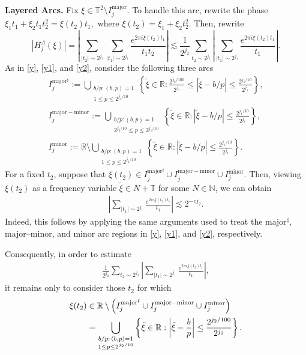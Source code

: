 \documentclass[11 pt,letterpaper]{amsart}
\theoremstyle{plain}
\theoremstyle{definition}
\theoremstyle{remark} \theoremstyle{exam} \theoremstyle{ob}
\numberwithin{equation}{section}
\begin{document}
\noindent\textbf{Layered Arcs.}
Fix $\xi\in
\mathbb{T}^2 \setminus I^{\mathrm{major}}_{j}.$ To handle this arc, rewrite the phase
$\xi_{1} t_1+\xi_{2} t_1t_2^2=\xi(t_2)t_1,$ where $\xi(t_2)=\xi_{1}+\xi_{2}t_2^2.$ Then, rewrite $$|H^{\Lambda}_{j}(\xi)|=\left|\sum_{|t_2|\sim 2^{j_2}}\sum_{|t_1|\sim 2^{j_1}}\frac{e^{2\pi i\xi(t_2)t_1}}{t_1t_2}\right|\lesssim \frac{1}{2^{j_2}}\sum_{t_2\sim 2^{j_2}}\left|\sum_{|t_1|\sim 2^{j_1}}\frac{e^{2\pi i\xi(t_2)t_1}}{t_1}\right|.$$ As in \eqref{y}, \eqref{y1}, and \eqref{y2}, consider the following three arcs \begin{align*}
I^{\mathrm{major^{\sharp}}}_{j}:= 	\bigcup_{\substack{b/p : (b,p)=1 \\ 1\le p \le 2^{j_2/10}}}
	\left\{
	\tilde{\xi} \in \mathbb{R} : \frac{2^{j_2/100}}{2^{j_1}}\le
	|\tilde{\xi} - b/p| \le \frac{2^{j_1/10}}{2^{j_1}}
	\right\},\\
I^{\mathrm{major-minor}}_{j}:=	\bigcup_{\substack{b/p : (b,p)=1 \\ 2^{j_2/10}\le p \le 2^{j_1/10}}}
	\left\{
	\tilde{\xi} \in \mathbb{R} :
	|\tilde{\xi} - b/p| \le \frac{2^{j_1/10}}{2^{j_1}}
	\right\},\\
 I^{\mathrm{minor}}_{j}:=	\mathbb{R}\setminus
	\bigcup_{\substack{b/p : (b,p)=1 \\ 1\le p \le 2^{j_1/10}}}
	\left\{
	\tilde{\xi} \in \mathbb{R} :
	|\tilde{\xi} - b/p| \le \frac{2^{j_1/10}}{2^{j_1}}
	\right\}.
\end{align*}  For a fixed  $t_2$, suppose that $\xi(t_2)\in I^{\mathrm{major^{\sharp}}}_{j}\cup I^{\mathrm{major-minor}}_{j}\cup   I^{\mathrm{minor}}_{j}.$ Then, viewing $\xi(t_2)$ as a frequency variable $\widetilde{\xi}\in N+\mathbb{T}$ for some $N\in\mathbb{N}$, 
we can obtain
\begin{align}\label{y77}
\left|
\sum_{|t_1|\sim 2^{j_1}}
\frac{e^{2\pi i \xi(t_2)t_1}}{t_1}
\right|
\lesssim 2^{-c j_2}.
\end{align}
Indeed, this follows by applying the same arguments used to treat the $\mathrm{major}^{\sharp}$, major--minor, and minor arc regions in \eqref{y}, \eqref{y1}, and \eqref{y2}, respectively.

Consequently, in order to estimate 
\begin{align*} \frac{1}{2^{j_2}} \sum_{t_2\sim 2^{j_2}} \left| \sum_{|t_1|\sim 2^{j_1}} \frac{e^{2\pi i \xi(t_2)t_1}}{t_1} \right|, 
\end{align*} 
it remains only to consider those $t_2$ for which 
\begin{align*} \xi(t_2) &\in \mathbb{R}\setminus \Bigl(  I^{\mathrm{major^{\sharp}}}_{j}\cup I^{\mathrm{major-minor}}_{j}\cup   I^{\mathrm{minor}}_{j} \Bigr) \\ &= \bigcup_{\substack{b/p:\,(b,p)=1\\ 1\le p\le 2^{j_2/10}}} \left\{ \tilde{\xi}\in\mathbb{R}: \left|\tilde{\xi}-\frac{b}{p}\right| \le \frac{2^{j_2/100}}{2^{j_1}} \right\}. 
\end{align*}
\end{document}

